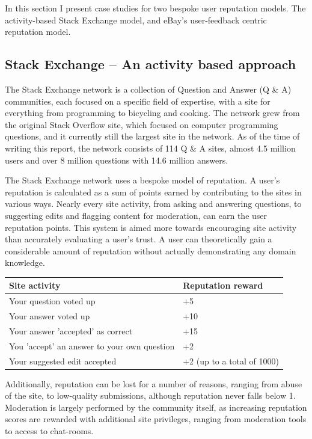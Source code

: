 \documentclass[]{final_report}
\begin{document}
In this section I present case studies for two bespoke user reputation models. The activity-based Stack Exchange model, and eBay's user-feedback centric reputation model.

\subsection{Stack Exchange -- An activity based approach}

The Stack Exchange network is a collection of Question and Answer (Q \& A) communities, each focused on a specific field of expertise, with a site for everything from programming to bicycling and cooking.  The network grew from the original Stack Overflow site, which focused on computer programming questions, and it currently still the largest site in the network. As of the time of writing this report, the network consists of 114 Q \& A sites, almost 4.5 million users and over 8 million questions with 14.6 million answers.

The Stack Exchange network uses a bespoke model of reputation. A user's reputation is calculated as a sum of points earned by contributing to the sites in various ways. Nearly every site activity, from asking and answering questions, to suggesting edits and flagging content for moderation, can earn the user reputation points. This system is aimed more towards encouraging site activity than accurately evaluating a user's trust. A user can theoretically gain a considerable amount of reputation without actually demonstrating any domain knowledge.


\begin{tabular}{|l|l|}
\hline \textbf{Site activity} & \textbf{Reputation reward} \\ 
\hline Your question voted up & +5 \\ 
\hline Your answer voted up & +10 \\ 
\hline Your answer 'accepted' as correct & +15 \\ 
\hline You 'accept' an answer to your own question & +2 \\ 
\hline Your suggested edit accepted & +2 (up to a total of 1000) \\ 
\hline  
\end{tabular}



Additionally, reputation can be lost for a number of reasons, ranging from abuse of the site, to low-quality submissions, although reputation never falls below 1. Moderation is largely performed by the community itself, as increasing reputation scores are rewarded with additional site privileges, ranging from moderation tools to access to chat-rooms.
\end{document}
